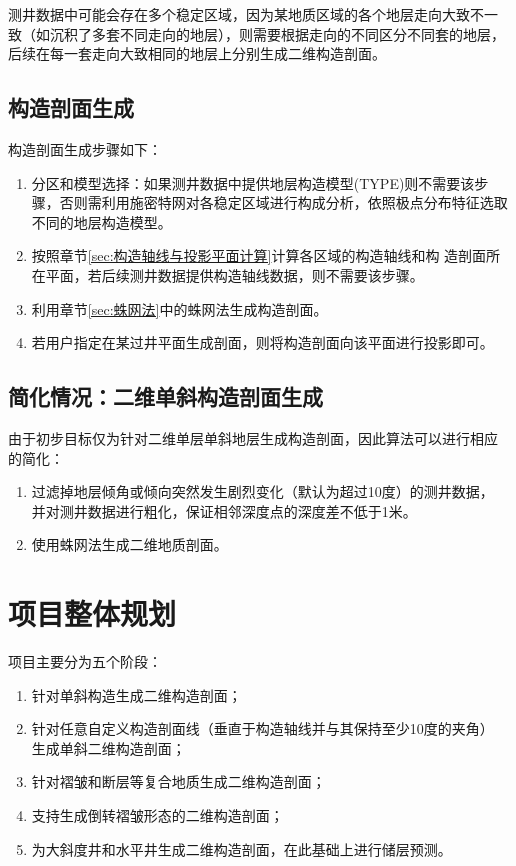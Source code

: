 \documentclass[a4paper,twoside]{ctexart}
\begin{document}
测井数据中可能会存在多个稳定区域，因为某地质区域的各个地层走向大致不一
致（如沉积了多套不同走向的地层），则需要根据走向的不同区分不同套的地层，
后续在每一套走向大致相同的地层上分别生成二维构造剖面。

\subsection{构造剖面生成}

构造剖面生成步骤如下：
\begin{enumerate}[步骤 1:]
\item 分区和模型选择：如果测井数据中提供地层构造模型(TYPE)则不需要该步
  骤，否则需利用施密特网对各稳定区域进行构成分析，依照极点分布特征选取
  不同的地层构造模型。 
\item 按照章节\ref{sec:构造轴线与投影平面计算}计算各区域的构造轴线和构
  造剖面所在平面，若后续测井数据提供构造轴线数据，则不需要该步骤。
\item 利用章节\ref{sec:蛛网法}中的蛛网法生成构造剖面。
\item 若用户指定在某过井平面生成剖面，则将构造剖面向该平面进行投影即可。
\end{enumerate}

\subsection{简化情况：二维单斜构造剖面生成}

由于初步目标仅为针对二维单层单斜地层生成构造剖面，因此算法可以进行相应
的简化：
\begin{enumerate}[步骤 1:]
\item 过滤掉地层倾角或倾向突然发生剧烈变化（默认为超过10度）的测井数据，
  并对测井数据进行粗化，保证相邻深度点的深度差不低于1米。
\item 使用蛛网法生成二维地质剖面。
\end{enumerate}

\section{项目整体规划}
项目主要分为五个阶段：
\begin{enumerate}[第1阶段：]
\item 针对单斜构造生成二维构造剖面；
\item 针对任意自定义构造剖面线（垂直于构造轴线并与其保持至少10度的夹角）
  生成单斜二维构造剖面；
\item 针对褶皱和断层等复合地质生成二维构造剖面；
\item 支持生成倒转褶皱形态的二维构造剖面；
\item 为大斜度井和水平井生成二维构造剖面，在此基础上进行储层预测。
\end{enumerate}
\end{document}
